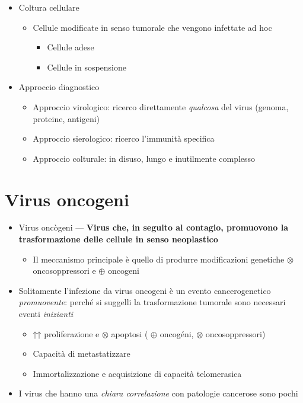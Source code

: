 \documentclass[italian,]{article}
\providecommand{\tightlist}{%
  \setlength{\itemsep}{0pt}\setlength{\parskip}{0pt}}
\newcommand{\att}[0]{ $\oplus$ }                                        %
\newcommand{\ini}[0]{ $\otimes$ }                                       %
\begin{document}
\begin{itemize}
\tightlist
\item
  Coltura cellulare

  \begin{itemize}
  \tightlist
  \item
    Cellule modificate in senso tumorale che vengono infettate ad hoc

    \begin{itemize}
    \tightlist
    \item
      Cellule adese
    \item
      Cellule in sospensione
    \end{itemize}
  \end{itemize}
\item
  Approccio diagnostico

  \begin{itemize}
  \tightlist
  \item
    Approccio virologico: ricerco direttamente \emph{qualcosa} del virus
    (genoma, proteine, antigeni)
  \item
    Approccio sierologico: ricerco l'immunità specifica
  \item
    Approccio colturale: in disuso, lungo e inutilmente complesso
  \end{itemize}
\end{itemize}

\hypertarget{virus-oncogeni}{%
\section{Virus oncogeni}\label{virus-oncogeni}}

\begin{itemize}
\tightlist
\item
  Virus oncògeni --- \textbf{Virus che, in seguito al contagio,
  promuovono la trasformazione delle cellule in senso neoplastico}

  \begin{itemize}
  \tightlist
  \item
    Il meccanismo principale è quello di produrre modificazioni
    genetiche \ini oncosoppressori e \att oncogeni
  \end{itemize}
\item
  Solitamente l'infezione da virus oncogeni è un evento cancerogenetico
  \emph{promuovente}: perché si suggelli la trasformazione tumorale sono
  necessari eventi \emph{inizianti}

  \begin{itemize}
  \tightlist
  \item
    ↑↑ proliferazione e \ini apoptosi (\att oncogéni,
    \ini oncosoppressori)
  \item
    Capacità di metastatizzare
  \item
    Immortalizzazione e acquisizione di capacità telomerasica
  \end{itemize}
\item
  I virus che hanno una \emph{chiara correlazione} con patologie
  cancerose sono pochi
\end{itemize}
\end{document}
